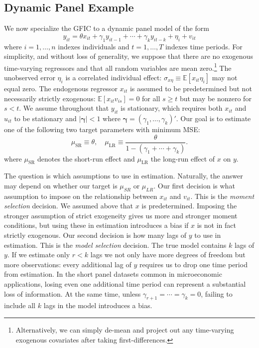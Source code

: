 \subsection{Dynamic Panel Example}
\label{sec:Dpanel}
We now specialize the GFIC to a dynamic panel model of the form 
\begin{equation}
  y_{it} = \theta x_{it} + \gamma_1 y_{it-1} + \cdots + \gamma_k y_{it-k} + \eta_i + v_{it}
  \label{eq:truepanel}
\end{equation}
where $i = 1, \hdots, n$ indexes individuals and $t=1, \hdots, T$  indexes time periods. 
For simplicity, and without loss of generality, we suppose that there are no exogenous time-varying regressors and that all random variables are mean zero.\footnote{Alternatively, we can simply de-mean and project out any time-varying exogenous covariates after taking first-differences.} 
The unobserved error $\eta_i$ is a correlated individual effect: $\sigma_{x\eta}\equiv \mathbb{E}\left[ x_{it}\eta_i \right]$ may not equal zero. 
The endogenous regressor $x_{it}$ is assumed to be predetermined but not necessarily strictly exogenous: $\mathbb{E}[x_{it} v_{is}]=0$ for all $s \geq t$ but may be nonzero for $s < t$.  
We assume throughout that $y_{it}$ is stationary, which requires both $x_{it}$ and $u_{it}$ to be stationary and $|\boldsymbol{\gamma}| < 1$ where $\boldsymbol{\gamma} = (\gamma_1, \dots, \gamma_k)'$.
Our goal is to estimate one of the following two target parameters with minimum MSE: 
\begin{equation}
  \mu_{\text{SR}} \equiv \theta, \quad \mu_{\text{LR}} \equiv \frac{\theta}{1- (\gamma_1 + \cdots + \gamma_k)}.
  \label{eq:paneltarget}
\end{equation}
where $\mu_{\text{SR}}$ denotes the short-run effect and $\mu_{\text{LR}}$ the long-run effect of $x$ on $y$.

The question is which assumptions to use in estimation.
Naturally, the answer may depend on whether our target is $\mu_{SR}$ or $\mu_{LR}$.
Our first decision is what assumption to impose on the relationship between $x_{it}$ and $v_{it}$.
This is the \emph{moment selection} decision.
We assumed above that $x$ is predetermined.
Imposing the stronger assumption of strict exogeneity gives us more and stronger moment conditions, but using these in estimation introduces a bias if $x$ is not in fact strictly exogenous.
Our second decision is how many lags of $y$ to use in estimation.
This is the \emph{model selection} decision.
The true model contains $k$ lags of $y$.
If we estimate only $r < k$ lags we not only have more degrees of freedom but more observations: every additional lag of $y$ requires us to drop one time period from estimation. 
In the short panel datasets common in microeconomic applications, losing even one additional time period can represent a substantial loss of information.
At the same time, unless $\gamma_{r+1} = \cdots = \gamma_k = 0$, failing to include all $k$ lags in the model introduces a bias.

